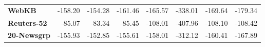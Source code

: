 \documentclass[10pt, t, xcolor={usenames,dvipsnames,svgnames}, compress]{beamer}
\begin{document}
\begin{frame}[t]
\begin{table}
\begin{tabular}{l r r r r r r r}
      \textbf{WebKB}      & -158.20 & -154.28 & -161.46 & -165.57 & -338.01 & -169.64 & -179.34 \\
      \textbf{Reuters-52} & -85.07  & -83.34  & -85.45  & -108.01 & -407.96 & -108.10 & -108.42 \\
      \textbf{20-Newsgrp} & -155.93 & -152.85 & -155.61 & -158.01 & -312.12 & -160.41 & -167.89 \\
    \end{tabular}
    \label{tab:model-accs}
  \end{table}
\end{frame}
\end{document}
